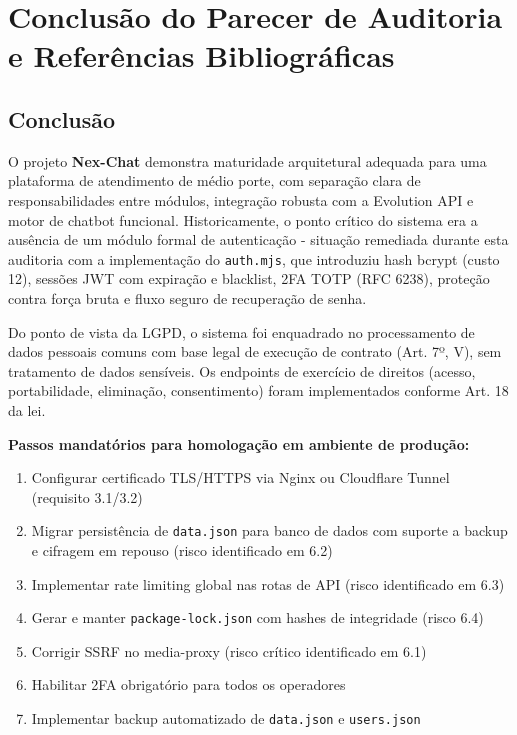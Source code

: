\documentclass[11pt, a4paper]{article}
\begin{document}
\section{Conclusão do Parecer de Auditoria e Referências Bibliográficas}

\subsection{Conclusão}

O projeto \textbf{Nex-Chat} demonstra maturidade arquitetural adequada para uma plataforma de atendimento de médio porte, com separação clara de responsabilidades entre módulos, integração robusta com a Evolution API e motor de chatbot funcional. Historicamente, o ponto crítico do sistema era a ausência de um módulo formal de autenticação - situação remediada durante esta auditoria com a implementação do \texttt{auth.mjs}, que introduziu hash bcrypt (custo 12), sessões JWT com expiração e blacklist, 2FA TOTP (RFC 6238), proteção contra força bruta e fluxo seguro de recuperação de senha.

Do ponto de vista da LGPD, o sistema foi enquadrado no processamento de dados pessoais comuns com base legal de execução de contrato (Art. 7º, V), sem tratamento de dados sensíveis. Os endpoints de exercício de direitos (acesso, portabilidade, eliminação, consentimento) foram implementados conforme Art. 18 da lei.

\textbf{Passos mandatórios para homologação em ambiente de produção:}
\begin{enumerate}
  \item Configurar certificado TLS/HTTPS via Nginx ou Cloudflare Tunnel (requisito 3.1/3.2)
  \item Migrar persistência de \texttt{data.json} para banco de dados com suporte a backup e cifragem em repouso (risco identificado em 6.2)
  \item Implementar rate limiting global nas rotas de API (risco identificado em 6.3)
  \item Gerar e manter \texttt{package-lock.json} com hashes de integridade (risco 6.4)
  \item Corrigir SSRF no media-proxy (risco crítico identificado em 6.1)
  \item Habilitar 2FA obrigatório para todos os operadores
  \item Implementar backup automatizado de \texttt{data.json} e \texttt{users.json}
\end{enumerate}
\end{document}
